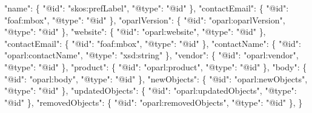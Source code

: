 \documentclass[,a4paper]{article}
\newenvironment{Shaded}{}{}
\newcommand{\DataTypeTok}[1]{\textcolor[rgb]{0.56,0.13,0.00}{{#1}}}
\newcommand{\StringTok}[1]{\textcolor[rgb]{0.25,0.44,0.63}{{#1}}}
\newcommand{\FunctionTok}[1]{\textcolor[rgb]{0.02,0.16,0.49}{{#1}}}
\begin{document}
\begin{Shaded}
\begin{Highlighting}[]
    \DataTypeTok{"name"}\FunctionTok{:} \FunctionTok{\{}
        \DataTypeTok{"@id"}\FunctionTok{:} \StringTok{"skos:prefLabel"}\FunctionTok{,}
        \DataTypeTok{"@type"}\FunctionTok{:} \StringTok{"@id"}
    \FunctionTok{\},}
    \DataTypeTok{"contactEmail"}\FunctionTok{:} \FunctionTok{\{}
        \DataTypeTok{"@id"}\FunctionTok{:} \StringTok{"foaf:mbox"}\FunctionTok{,}
        \DataTypeTok{"@type"}\FunctionTok{:} \StringTok{"@id"}
    \FunctionTok{\},}
    \DataTypeTok{"oparlVersion"}\FunctionTok{:} \FunctionTok{\{}
        \DataTypeTok{"@id"}\FunctionTok{:} \StringTok{"oparl:oparlVersion"}\FunctionTok{,}
        \DataTypeTok{"@type"}\FunctionTok{:} \StringTok{"@id"}
    \FunctionTok{\},}
    \DataTypeTok{"website"}\FunctionTok{:} \FunctionTok{\{}
        \DataTypeTok{"@id"}\FunctionTok{:} \StringTok{"oparl:website"}\FunctionTok{,}
        \DataTypeTok{"@type"}\FunctionTok{:} \StringTok{"@id"}
    \FunctionTok{\},}
    \DataTypeTok{"contactEmail"}\FunctionTok{:} \FunctionTok{\{}
        \DataTypeTok{"@id"}\FunctionTok{:} \StringTok{"foaf:mbox"}\FunctionTok{,}
        \DataTypeTok{"@type"}\FunctionTok{:} \StringTok{"@id"}
    \FunctionTok{\},}
    \DataTypeTok{"contactName"}\FunctionTok{:} \FunctionTok{\{}
        \DataTypeTok{"@id"}\FunctionTok{:} \StringTok{"oparl:contactName"}\FunctionTok{,}
        \DataTypeTok{"@type"}\FunctionTok{:} \StringTok{"xsd:string"}
    \FunctionTok{\},}
    \DataTypeTok{"vendor"}\FunctionTok{:} \FunctionTok{\{}
        \DataTypeTok{"@id"}\FunctionTok{:} \StringTok{"oparl:vendor"}\FunctionTok{,}
        \DataTypeTok{"@type"}\FunctionTok{:} \StringTok{"@id"}
    \FunctionTok{\},}
    \DataTypeTok{"product"}\FunctionTok{:} \FunctionTok{\{}
        \DataTypeTok{"@id"}\FunctionTok{:} \StringTok{"oparl:product"}\FunctionTok{,}
        \DataTypeTok{"@type"}\FunctionTok{:} \StringTok{"@id"}
    \FunctionTok{\},}
    \DataTypeTok{"body"}\FunctionTok{:} \FunctionTok{\{}
        \DataTypeTok{"@id"}\FunctionTok{:} \StringTok{"oparl:body"}\FunctionTok{,}
        \DataTypeTok{"@type"}\FunctionTok{:} \StringTok{"@id"}
    \FunctionTok{\},}
    \DataTypeTok{"newObjects"}\FunctionTok{:} \FunctionTok{\{}
        \DataTypeTok{"@id"}\FunctionTok{:} \StringTok{"oparl:newObjects"}\FunctionTok{,}
        \DataTypeTok{"@type"}\FunctionTok{:} \StringTok{"@id"}
    \FunctionTok{\},}
    \DataTypeTok{"updatedObjects"}\FunctionTok{:} \FunctionTok{\{}
        \DataTypeTok{"@id"}\FunctionTok{:} \StringTok{"oparl:updatedObjects"}\FunctionTok{,}
        \DataTypeTok{"@type"}\FunctionTok{:} \StringTok{"@id"}
    \FunctionTok{\},}  
    \DataTypeTok{"removedObjects"}\FunctionTok{:} \FunctionTok{\{}
        \DataTypeTok{"@id"}\FunctionTok{:} \StringTok{"oparl:removedObjects"}\FunctionTok{,}
        \DataTypeTok{"@type"}\FunctionTok{:} \StringTok{"@id"}
    \FunctionTok{\},}  
\FunctionTok{\}}
\end{Highlighting}
\end{Shaded}
\end{document}
